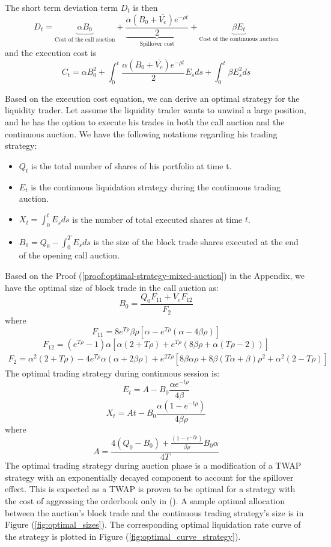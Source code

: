 The short term deviation term $D_t$ is then
\[
  D_t = \underbrace{\alpha B_0 }_\text{Cost of the call auction} +
  \underbrace{\frac{\alpha (B_0 + \bar{V_e}) e^{-\rho t}}{2}}_\text{Spillover cost} +  \underbrace{\beta E_t}_\text{Cost of the continuous auction}
\]
and the execution cost is
\begin{equation}\label{eqn:cost_equation_all}
  C_t = \alpha B_0^2 + \int_0^t \frac{\alpha (B_0 + \bar{V_e}) e^{-\rho t}}{2} E_s ds + \int_0^t \beta E_s^2 ds
\end{equation}

Based on the execution cost equation, we can derive an optimal strategy for the liquidity trader. Let assume the liquidity trader wants to unwind a large position, and he has the option to execute his trades in both the call auction and the continuous auction. We have the following notations regarding his trading strategy:

\begin{itemize}
  \item $Q_t$ is the total number of shares of his portfolio at time t.
  \item $E_t$ is the continuous liquidation strategy during the continuous trading auction.
  \item $X_t=\int_0^t E_s ds$ is the number of total executed shares at time $t$.
  \item $B_0=Q_0 - \int_0^T E_s ds$ is the size of the block trade shares executed at the end of the opening call auction.
\end{itemize}

Based on the Proof (\ref{proof:optimal-strategy-mixed-auction}) in the Appendix, we have the optimal size of block trade in the call auction as:
\[
  B_0 = \frac{Q_0 F_{11} + V_e F_{12}}{F_2}
\]
where
\[
  F_{11} = 8 e^{T \rho} \beta \rho [\alpha - e^{T \rho} (\alpha - 4 \beta \rho)]
\]
\[
  F_{12} = (e^{T \rho}-1) \alpha [\alpha (2+T \rho) + e^{T \rho} (8 \beta \rho + \alpha (T \rho - 2 ))]
\]
\[
  \begin{split}
    F_2 = \alpha^2 (2 + T \rho) - 4 e^{T \rho} \alpha (\alpha + 2 \beta \rho)
    + e^{2 T \rho} [8 \beta \alpha \rho + 8 \beta (T \alpha + \beta) \rho^2 + \alpha^2 (2 - T \rho)]
  \end{split}
\]
The optimal trading strategy during continuous session is:
\[
  E_t = A - B_0 \frac{\alpha e^{-t \rho}}{4 \beta}
\]
\[
  X_t = A t - B_0 \frac{\alpha (1- e^{-t \rho})}{4 \beta \rho}
\]
where
\[
  A =   \frac{4 (Q_0 - B_0) + \frac{(1 - e^{-T \rho})}{\beta \rho} B_0 \alpha} {4 T}
\]
The optimal trading strategy during auction phase is a modification of a TWAP strategy with an exponentially decayed component to account for the spillover effect. This is expected as a TWAP is proven to be optimal for a strategy with the cost of aggressing the orderbook only in (\cite{Ho1981}). A sample optimal allocation between the auction's block trade and the continuous trading strategy's size is in Figure (\ref{fig:optimal_sizes}). The corresponding optimal liquidation rate curve of the strategy is plotted in Figure (\ref{fig:optimal_curve_strategy}).

